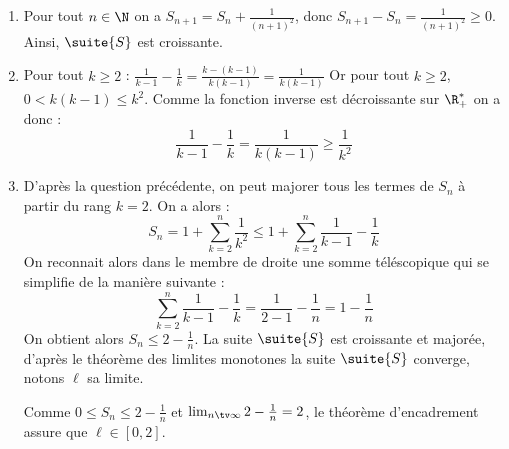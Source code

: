 \documentclass[a4paper, 11pt,reqno]{article}
\begin{document}
\begin{correction}
\begin{enumerate}
\item Pour tout $n\in \N$ on a  $S_{n+1} = S_n + \frac{1}{(n+1)^2}$, donc 
$S_{n+1}-S_n = \frac{1}{(n+1)^2}\geq 0$. Ainsi, $\suite{S}$ est croissante. 
\item Pour tout $k\geq 2$ : $\frac{1}{k-1}-\frac{1}{k}= \frac{k-(k-1)}{k(k-1)}= \frac{1}{k(k-1)}$
Or pour tout $k\geq 2$,  $0<k(k-1) \leq k^2$. Comme la fonction inverse est décroissante sur $\R_+^*$ on a donc : 
$$\frac{1}{k-1}-\frac{1}{k}=\frac{1}{k(k-1)}\geq \frac{1}{k^2}$$

\item  D'après la question précédente, on peut majorer tous les termes de $S_n$ à partir du rang $k=2$. On  a alors : 
$$S_n = 1+ \sum_{k=2}^n\frac{1}{k^2} \leq 1 + \sum_{k=2}^n\frac{1}{k-1} -\frac{1}{k}$$
On reconnait alors dans le  membre de droite une somme téléscopique qui se simplifie de la manière suivante : 
$$\sum_{k=2}^n\frac{1}{k-1} -\frac{1}{k} = \frac{1}{2-1} -\frac{1}{n} = 1-\frac{1}{n}$$
On obtient alors $S_n  \leq 2-\frac{1}{n}$. 
La suite $\suite{S}$ est croissante et majorée, d'après le théorème des limlites monotones la suite $\suite{S}$ converge, notons $\ell$ sa limite. 

Comme $0\leq S_n\leq 2-\frac{1}{n}$ et $\lim_{n\tv \infty} 2-\frac{1}{n}=2$, le théorème d'encadrement assure que $\ell\in [0,2]$. 
 


\end{enumerate}
\end{correction}


\end{document}
